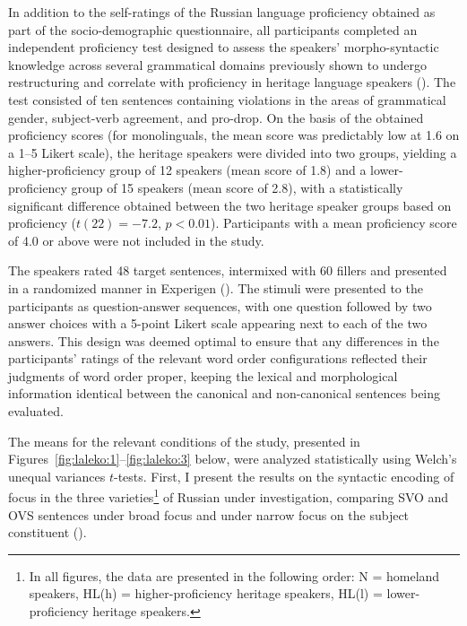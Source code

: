 \documentclass[output=paper]{langscibook}
\begin{document}
In addition to the self-ratings of the Russian language proficiency obtained as part of the socio-demographic questionnaire, all participants completed an independent proficiency test designed to assess the speakers’ morpho-syntactic knowledge across several grammatical domains previously shown to undergo restructuring and correlate with proficiency in heritage language speakers (\citealt{Polinsky2018}). The test consisted of ten sentences containing violations in the areas of grammatical gender, subject-verb agreement, and pro-drop. On the basis of the obtained proficiency scores (for monolinguals, the mean score was predictably low at 1.6 on a 1--5 Likert scale), the heritage speakers were divided into two groups, yielding a higher-proficiency group of 12 speakers (mean score of 1.8) and a lower-proficiency group of 15 speakers (mean score of 2.8), with a statistically significant difference obtained between the two heritage speaker groups based on proficiency ($t(22)=-7.2$, $p<0.01$). Participants with a mean proficiency score of 4.0 or above were not included in the study.

The speakers rated 48 target sentences, intermixed with 60 fillers and presented in a randomized manner in Experigen (\citealt{BeckerLevine2013}). The stimuli were presented to the participants as question-answer sequences, with one question followed by two answer choices with a 5-point Likert scale appearing next to each of the two answers. This design was deemed optimal to ensure that any differences in the participants’ ratings of the relevant word order configurations reflected their judgments of word order proper, keeping the lexical and morphological information identical between the canonical and non-canonical sentences being evaluated.

The means for the relevant conditions of the study, presented in Figures~\ref{fig:laleko:1}--\ref{fig:laleko:3} below, were analyzed statistically using Welch’s unequal variances $t$-tests. First, I present the results on the syntactic encoding of focus in the three varieties\footnote{In all figures, the data are presented in the following order: N = homeland speakers, HL(h) = higher-proficiency heritage speakers, HL(l) = lower-proficiency heritage speakers.} of Russian under investigation, comparing SVO and OVS sentences under broad focus and under narrow focus on the subject constituent ().
\end{document}
